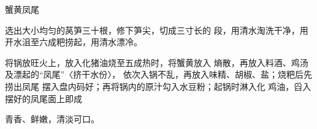 \begin{recipe}{蟹黄凤尾}

\ingredients


\cooking

\step 	选出大小均匀的莴笋三十根，修下笋尖，切成三寸长的 段，用清水淘洗干净，用开水沮至六成粑捞起，用清水漂冷。

\step 	将锅放旺火上，放入化猪油烧至五成热时，将蟹黄放入 熵散，再放入料酒、鸡汤及漂起的“凤尾”〈挤干水份〉， 依次入锅不乱，再放入味精、胡椒、盐；烧粑后先捞出凤尾 摆入盘内码好；再将锅内的原汁勾入水豆粉；起锅时淋入化 鸡油，舀入摆好的凤尾面上即成

\notes

青香、鲜嫩，清淡可口。

\end{recipe}

